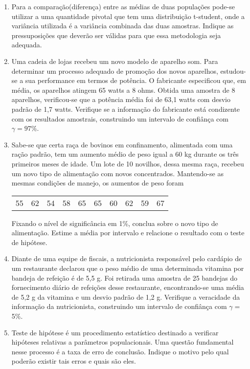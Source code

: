 \documentclass[10pt,brazil,addpoints]{exam}
\begin{document}
\begin{enumerate}[1.]
\medskip
\item Para a comparação(diferença) entre as médias de duas populações pode-se utilizar a uma quantidade pivotal que tem uma distribuição t-student, onde a variância utilizada é a variância combinada das duas amostras. Indique as pressuposições que deverão ser válidas para que essa metodologia seja adequada.



\medskip
\item Uma cadeia de lojas recebeu um novo modelo de aparelho som. Para determinar um processo adequado de promoção dos novos aparelhos, estudou-se a sua performance em termos de potência. O fabricante especificou que, em média, os aparelhos atingem 65 watts a 8 ohms. Obtida uma amostra de 8 aparelhos, verificou-se que a potência média foi de 63,1 watts com desvio padrão de 1,7 watts. Verifique se a informação do fabricante está condizente com os resultados amostrais, construindo um intervalo de confiânça com $\gamma=97$\%.



\medskip
\item Sabe-se que certa raça de bovinos em confinamento, alimentada com uma ração padrão, tem um aumento médio de peso igual a 60 kg durante os três primeiros meses de idade. Um lote de 10 novilhos, dessa mesma raça, recebeu um novo tipo de alimentação com novos concentrados. Mantendo-se as mesmas condições de manejo, os aumentos de peso foram
\begin{center}
\begin{tabular}{cccccccccc}
55 & 62 &  54 & 58 & 65 & 65 &  60 & 62 &  59 &  67
\end{tabular}
\end{center}
Fixando o nível de significância em 1\%, conclua sobre o novo tipo de alimentação. Estime a média por intervalo e relacione o resultado com o teste de hipótese.


\medskip
\item Diante de uma equipe de fiscais, a nutricionista responsável pelo cardápio de um restaurante declarou que o peso médio de uma determinada vitamina por bandeja de refeição é de 5,5 g. Foi retirada uma amostra de 25 bandejas do fornecimento diário de refeições desse restaurante, encontrando-se uma média de 5,2 g da vitamina e um desvio padrão de 1,2 g. Verifique a veracidade da informação da nutricionista, construindo um intervalo de confiânça com $\gamma=$5\%.


\medskip
\item Teste de hipótese é um procedimento estatístico destinado a verificar hipóteses relativas a parâmetros populacionais. Uma questão fundamental nesse processo é a taxa de erro de conclusão. Indique o motivo pelo qual poderão existir tais erros e quais são eles.





\end{enumerate}
\end{document}
